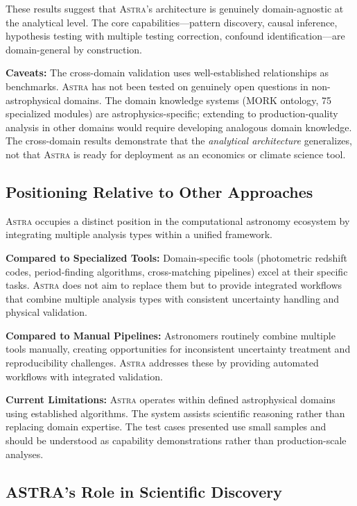 \documentclass[usenatbib]{rasti}
\newcommand{\astra}{\textsc{Astra}\xspace}
\begin{document}
These results suggest that \astra's architecture is genuinely domain-agnostic at the analytical level.
The core capabilities---pattern discovery, causal inference, hypothesis testing with multiple testing correction, confound identification---are domain-general by construction.

\textbf{Caveats:}
The cross-domain validation uses well-established relationships as benchmarks. \astra has not been tested on genuinely open questions in non-astrophysical domains.
The domain knowledge systems (MORK ontology, 75 specialized modules) are astrophysics-specific; extending to production-quality analysis in other domains would require developing analogous domain knowledge.
The cross-domain results demonstrate that the \emph{analytical architecture} generalizes, not that \astra is ready for deployment as an economics or climate science tool.

\subsection{Positioning Relative to Other Approaches}
\label{sec:discussion:positioning}

\astra occupies a distinct position in the computational astronomy ecosystem by integrating multiple analysis types within a unified framework.

\textbf{Compared to Specialized Tools:}
Domain-specific tools (photometric redshift codes, period-finding algorithms, cross-matching pipelines) excel at their specific tasks.
\astra does not aim to replace them but to provide integrated workflows that combine multiple analysis types with consistent uncertainty handling and physical validation.

\textbf{Compared to Manual Pipelines:}
Astronomers routinely combine multiple tools manually, creating opportunities for inconsistent uncertainty treatment and reproducibility challenges.
\astra addresses these by providing automated workflows with integrated validation.

\textbf{Current Limitations:}
\astra operates within defined astrophysical domains using established algorithms.
The system assists scientific reasoning rather than replacing domain expertise.
The test cases presented use small samples and should be understood as capability demonstrations rather than production-scale analyses.

\subsection{ASTRA's Role in Scientific Discovery}
\label{sec:discussion:role}
\end{document}
